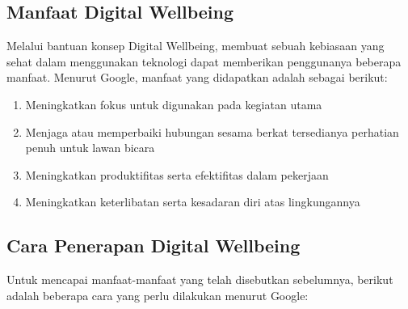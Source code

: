 \subsection{Manfaat Digital Wellbeing}

Melalui bantuan konsep Digital Wellbeing, membuat sebuah kebiasaan yang sehat dalam menggunakan teknologi dapat memberikan penggunanya beberapa manfaat. Menurut Google, manfaat yang didapatkan adalah sebagai berikut:

\begin{enumerate}
  \item Meningkatkan fokus untuk digunakan pada kegiatan utama
  \item Menjaga atau memperbaiki hubungan sesama berkat tersedianya perhatian penuh untuk lawan bicara
  \item Meningkatkan produktifitas serta efektifitas dalam pekerjaan
  \item Meningkatkan keterlibatan serta kesadaran diri atas lingkungannya
\end{enumerate}

\subsection{Cara Penerapan Digital Wellbeing}

Untuk mencapai manfaat-manfaat yang telah disebutkan sebelumnya, berikut adalah beberapa cara yang perlu dilakukan menurut Google:

